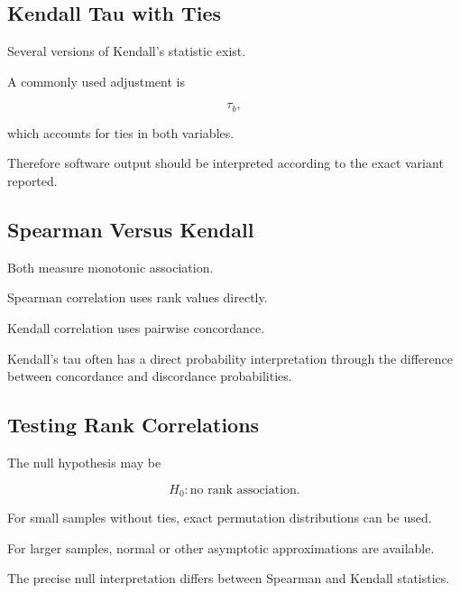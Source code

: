 \subsection{Kendall Tau with Ties}
\label{subsec:kendall-ties}

Several versions of Kendall's statistic exist.

A commonly used adjustment is

\[
\tau_b,
\]

which accounts for ties in both variables.

Therefore software output should be interpreted according to the exact
variant reported.

\subsection{Spearman Versus Kendall}
\label{subsec:spearman-versus-kendall}

Both measure monotonic association.

Spearman correlation uses rank values directly.

Kendall correlation uses pairwise concordance.

Kendall's tau often has a direct probability interpretation through the
difference between concordance and discordance probabilities.

\subsection{Testing Rank Correlations}
\label{subsec:testing-rank-correlations}

The null hypothesis may be

\[
\boxed{
H_0:
\text{no rank association}.
}
\]

For small samples without ties, exact permutation distributions can be
used.

For larger samples, normal or other asymptotic approximations are
available.

The precise null interpretation differs between Spearman and Kendall
statistics.

